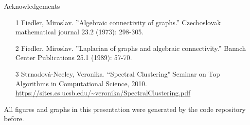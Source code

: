 \documentclass[hyperref, notheorems]{beamer}
\theoremstyle{definition}
\begin{document}
\begin{frame}{Acknowledgements}
    \begin{itemize}
        \item [1] Fiedler, Miroslav. ”Algebraic connectivity of graphs.” Czechoslovak mathematical journal 23.2 (1973): 298-305.
        \item [2] Fiedler, Miroslav. ”Laplacian of graphs and algebraic connectivity.” Banach Center Publications 25.1 (1989): 57-70.
        \item [3] Strnadová-Neeley, Veronika. ``Spectral Clustering" Seminar on Top Algorithms in Computational Science, 2010. \url{https://sites.cs.ucsb.edu/~veronika/SpectralClustering.pdf}
    \end{itemize}
    All figures and graphs in this presentation were generated by the code repository before.
\end{frame}
\end{document}
